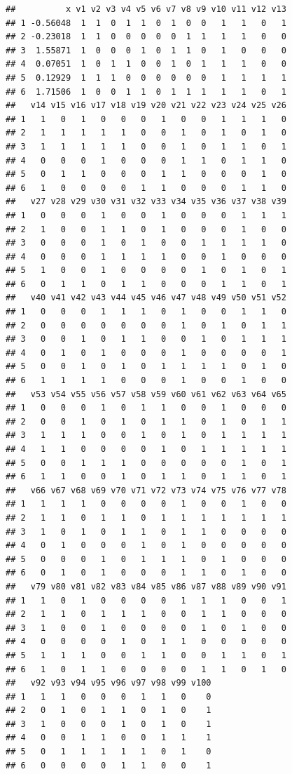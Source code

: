 \documentclass[
]{krantz}
\begin{document}
\begin{verbatim}
##          x v1 v2 v3 v4 v5 v6 v7 v8 v9 v10 v11 v12 v13
## 1 -0.56048  1  1  0  1  1  0  1  0  0   1   1   0   1
## 2 -0.23018  1  1  0  0  0  0  0  1  1   1   1   0   0
## 3  1.55871  1  0  0  0  1  0  1  1  0   1   0   0   0
## 4  0.07051  1  0  1  1  0  0  1  0  1   1   1   0   0
## 5  0.12929  1  1  1  0  0  0  0  0  0   1   1   1   1
## 6  1.71506  1  0  0  1  1  0  1  1  1   1   1   0   1
##   v14 v15 v16 v17 v18 v19 v20 v21 v22 v23 v24 v25 v26
## 1   1   0   1   0   0   0   1   0   0   1   1   1   0
## 2   1   1   1   1   1   0   0   1   0   1   0   1   0
## 3   1   1   1   1   1   0   0   1   0   1   1   0   1
## 4   0   0   0   1   0   0   0   1   1   0   1   1   0
## 5   0   1   1   0   0   0   1   1   0   0   0   1   0
## 6   1   0   0   0   0   1   1   0   0   0   1   1   0
##   v27 v28 v29 v30 v31 v32 v33 v34 v35 v36 v37 v38 v39
## 1   0   0   0   1   0   0   1   0   0   0   1   1   1
## 2   1   0   0   1   1   0   1   0   0   0   1   0   0
## 3   0   0   0   1   0   1   0   0   1   1   1   1   0
## 4   0   0   0   1   1   1   1   0   0   1   0   0   0
## 5   1   0   0   1   0   0   0   0   1   0   1   0   1
## 6   0   1   1   0   1   1   0   0   0   1   1   0   1
##   v40 v41 v42 v43 v44 v45 v46 v47 v48 v49 v50 v51 v52
## 1   0   0   0   1   1   1   0   1   0   0   1   1   0
## 2   0   0   0   0   0   0   0   1   0   1   0   1   1
## 3   0   0   1   0   1   1   0   0   1   0   1   1   1
## 4   0   1   0   1   0   0   0   1   0   0   0   0   1
## 5   0   0   1   0   1   0   1   1   1   1   0   1   0
## 6   1   1   1   1   0   0   0   1   0   0   1   0   0
##   v53 v54 v55 v56 v57 v58 v59 v60 v61 v62 v63 v64 v65
## 1   0   0   0   1   0   1   1   0   0   1   0   0   0
## 2   0   0   1   0   1   0   1   1   0   1   0   1   1
## 3   1   1   1   0   0   1   0   1   0   1   1   1   1
## 4   1   1   0   0   0   0   1   0   1   1   1   1   1
## 5   0   0   1   1   1   0   0   0   0   0   1   0   1
## 6   1   1   0   0   1   0   1   1   0   1   1   0   1
##   v66 v67 v68 v69 v70 v71 v72 v73 v74 v75 v76 v77 v78
## 1   1   1   1   0   0   0   0   1   0   0   1   0   0
## 2   1   1   0   1   1   0   1   1   1   1   1   1   1
## 3   1   0   1   0   1   1   0   1   1   0   0   0   0
## 4   0   1   0   0   0   1   0   1   0   0   0   0   0
## 5   0   0   0   1   0   1   1   1   0   1   0   0   0
## 6   0   1   0   1   0   0   0   1   1   0   1   0   0
##   v79 v80 v81 v82 v83 v84 v85 v86 v87 v88 v89 v90 v91
## 1   1   0   1   0   0   0   0   1   1   1   0   0   1
## 2   1   1   0   1   1   1   0   0   1   1   0   0   0
## 3   1   0   0   1   0   0   0   0   1   0   1   0   0
## 4   0   0   0   0   1   0   1   1   0   0   0   0   0
## 5   1   1   1   0   0   1   1   0   0   1   1   0   1
## 6   1   0   1   1   0   0   0   0   1   1   0   1   0
##   v92 v93 v94 v95 v96 v97 v98 v99 v100
## 1   1   1   0   0   0   1   1   0    0
## 2   0   1   0   1   1   0   1   0    1
## 3   1   0   0   0   1   0   1   0    1
## 4   0   0   1   1   0   0   1   1    1
## 5   0   1   1   1   1   1   0   1    0
## 6   0   0   0   0   1   1   0   0    1
\end{verbatim}
\end{document}
